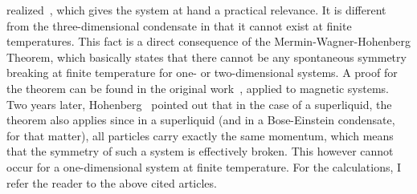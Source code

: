 realized~\cite{moritz}, which gives the system at hand a practical relevance. It is different from the three-dimensional condensate in that it cannot exist at
finite temperatures. This fact is a direct consequence of the Mermin-Wagner-Hohenberg Theorem, which basically states that there cannot be any spontaneous symmetry
breaking at finite temperature for one- or two-dimensional systems. A proof for the theorem can be found in the original
work~\cite{mermin}, applied to
magnetic systems. Two years later,
Hohenberg~\cite{hohenberg} pointed out that in the case of a superliquid, the theorem also applies since in a superliquid (and in a Bose-Einstein condensate, for
that matter), all particles carry exactly the same momentum, which means that the symmetry of such a system is effectively broken. This however cannot occur for a
one-dimensional system at finite temperature. For the calculations, I refer the reader to the above cited articles. 

